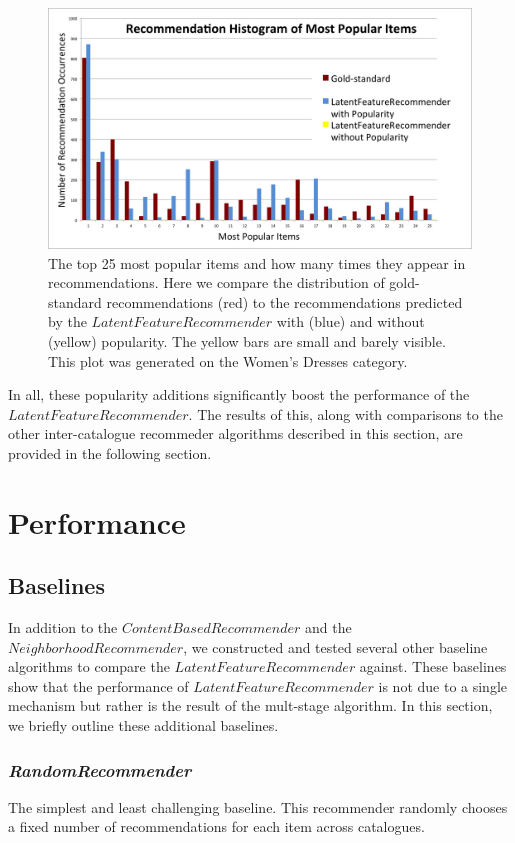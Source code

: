 \documentclass[11pt]{article}
\begin{document}
\begin{figure}[!htbp]
    \centering
    \includegraphics[width=1.0\textwidth]{PopularityHistogram2.png}
	\caption{The top 25 most popular items and how many times they appear in
    recommendations. Here we compare the distribution of gold-standard
    recommendations (red) to the recommendations predicted by the
    $LatentFeatureRecommender$ with (blue) and without (yellow) popularity. The
    yellow bars are small and barely visible. This plot was generated on the
    Women's Dresses category.}
    \label{fig:PopularityHistogram}
\end{figure}

In all, these popularity additions significantly boost the performance of the
\linebreak $LatentFeatureRecommender$. The results of this, along with
comparisons to the other inter-catalogue  recommeder algorithms described in
this section, are provided in the following section.

\section*{Performance}
\subsection*{Baselines}
In addition to the $ContentBasedRecommender$ and the $NeighborhoodRecommender$,
we constructed and tested several other baseline algorithms to compare the
$LatentFeatureRecommender$ against. These baselines show that the performance of
$LatentFeatureRecommender$ is not due to a single mechanism but rather is the
result of the mult-stage algorithm. In this section, we briefly outline these
additional baselines.

\subsubsection*{\em RandomRecommender}
The simplest and least challenging baseline. This recommender randomly chooses a
fixed number of recommendations for each item across catalogues.
\end{document}
